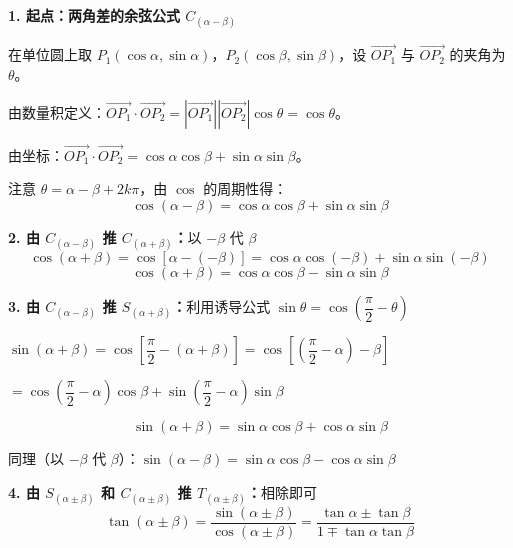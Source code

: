 \documentclass[UTF8,10pt,aspectratio=169]{ctexbeamer}
\begin{document}
	\begin{frame}
		\textbf{1. 起点：两角差的余弦公式 $C_{(\alpha-\beta)}$}
		
		\vspace{0.3cm}
		在单位圆上取 $P_1(\cos\alpha, \sin\alpha)$，$P_2(\cos\beta, \sin\beta)$，设 $\overrightarrow{OP_1}$ 与 $\overrightarrow{OP_2}$ 的夹角为 $\theta$。
		
		\vspace{0.2cm}
		由数量积定义：$\overrightarrow{OP_1} \cdot \overrightarrow{OP_2} = |\overrightarrow{OP_1}||\overrightarrow{OP_2}|\cos\theta = \cos\theta$。
		
		\vspace{0.1cm}
		由坐标：$\overrightarrow{OP_1} \cdot \overrightarrow{OP_2} = \cos\alpha\cos\beta + \sin\alpha\sin\beta$。
		
		\vspace{0.2cm}
		注意 $\theta = \alpha - \beta + 2k\pi$，由 $\cos$ 的周期性得：
		$$\boxed{\cos(\alpha - \beta) = \cos\alpha\cos\beta + \sin\alpha\sin\beta}$$
		
		\pause
		\vspace{0.3cm}
		\textbf{2. 由 $C_{(\alpha-\beta)}$ 推 $C_{(\alpha+\beta)}$：}以 $-\beta$ 代 $\beta$
		$$\cos(\alpha+\beta) = \cos[\alpha-(-\beta)] = \cos\alpha\cos(-\beta) + \sin\alpha\sin(-\beta)$$
		$$\boxed{\cos(\alpha + \beta) = \cos\alpha\cos\beta - \sin\alpha\sin\beta}$$
	\end{frame}
	
	\begin{frame}
		\textbf{3. 由 $C_{(\alpha-\beta)}$ 推 $S_{(\alpha+\beta)}$：}利用诱导公式 $\sin\theta = \cos(\dfrac{\pi}{2} - \theta)$
		
		\vspace{0.2cm}
		$\sin(\alpha+\beta) = \cos\left[\dfrac{\pi}{2} - (\alpha+\beta)\right] = \cos\left[(\dfrac{\pi}{2} - \alpha) - \beta\right]$
		
		\vspace{0.1cm}
		$= \cos(\dfrac{\pi}{2} - \alpha)\cos\beta + \sin(\dfrac{\pi}{2} - \alpha)\sin\beta$
		
		\vspace{0.1cm}
		$$\boxed{\sin(\alpha + \beta) = \sin\alpha\cos\beta + \cos\alpha\sin\beta}$$
		
		\vspace{0.2cm}
		同理（以 $-\beta$ 代 $\beta$）：$\boxed{\sin(\alpha - \beta) = \sin\alpha\cos\beta - \cos\alpha\sin\beta}$
		
		\pause
		\vspace{0.3cm}
		\textbf{4. 由 $S_{(\alpha\pm\beta)}$ 和 $C_{(\alpha\pm\beta)}$ 推 $T_{(\alpha\pm\beta)}$：}相除即可
		$$\tan(\alpha \pm \beta) = \dfrac{\sin(\alpha \pm \beta)}{\cos(\alpha \pm \beta)} = \boxed{\dfrac{\tan\alpha \pm \tan\beta}{1 \mp \tan\alpha\tan\beta}}$$
	\end{frame}
	
\end{document}
